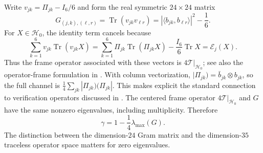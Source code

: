 \documentclass[11pt,a4paper]{article}
\theoremstyle{remark}
\DeclareMathOperator{\Tr}{Tr}
\newcommand{\E}{\mathcal E}
\newcommand{\T}{\mathcal T}
\newcommand{\HH}{\mathcal H_0}
\begin{document}
Write $v_{jk}=\Pi_{jk}-I_6/6$ and form the real symmetric $24\times24$ matrix
\begin{equation}\label{eq:gram}
 G_{(j,k),(\ell,r)}=\Tr(v_{jk}v_{\ell r})
       =|\langle b_{jk},b_{\ell r}\rangle|^2-\frac16.
\end{equation}
For $X\in\HH$, the identity term cancels because
\[
 \sum_{k=1}^6 v_{jk}\Tr(v_{jk}X)
 =\sum_{k=1}^6\Pi_{jk}\Tr(\Pi_{jk}X)
   -\frac{I_6}{6}\Tr X=\E_j(X).
\]
Thus the frame operator associated with these vectors is $4\T|_{\HH}$; see also the operator-frame formulation in \cite{roy}.
With column vectorization, $|\Pi_{jk})=\bar b_{jk}\otimes b_{jk}$, so the full channel is $\frac14\sum_{jk}|\Pi_{jk})(\Pi_{jk}|$. This makes explicit the standard connection to verification operators discussed in \cite{zhu}. The centered frame operator $4\T|_{\HH}$ and $G$ have the same nonzero eigenvalues, including multiplicity. Therefore
\begin{equation}\label{eq:gramgap}
 \gamma=1-\frac14\lambda_{\max}(G).
\end{equation}
The distinction between the dimension-$24$ Gram matrix and the dimension-$35$ traceless operator space matters for zero eigenvalues.
\end{document}
